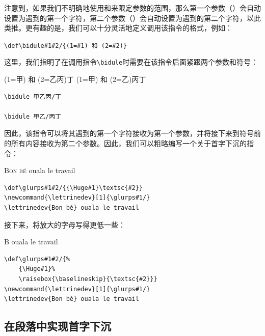 注意到，如果我们不明确地使用\dm{\{}和\dm{\}}来限定参数的范围，那么第一个参数（）会自动设置为遇到的第一个字符，第二个参数（）会自动设置为遇到的第二个字符，以此类推。更有趣的是，我们可以十分灵活地定义调用该指令的格式，例如：

\begin{dmd}
\verb|\def\bidule#1#2/{(1=#1) 和 (2=#2)}|
\end{dmd}

这里，我们指明了在调用指令\verb|\bidule|时需要在该指令后面紧跟两个参数和符号\dm{/}：

\begin{codelist}[11.20]{
\def\bidule#1#2/{(1=#1) 和 (2=#2)}
\bidule 甲乙丙/丁
\bidule 甲乙/丙丁
}\begin{verbatim}
\bidule 甲乙丙/丁

\bidule 甲乙/丙丁
\end{verbatim}
\end{codelist}

因此，该指令可以将其遇到的第一个字符接收为第一个参数，并将接下来到符号\dm{/}前的所有内容接收为第二个参数。因此，我们可以粗略编写一个关于首字下沉的指令：

\begin{codelist}[11.21]{
\def\glurps#1#2/{{\Huge#1}\textsc{#2}}
\newcommand{\lettrinedev}[1]{\glurps#1/}
\lettrinedev{Bon bé} ouala le travail
}\begin{verbatim}
\def\glurps#1#2/{{\Huge#1}\textsc{#2}}
\newcommand{\lettrinedev}[1]{\glurps#1/}
\lettrinedev{Bon bé} ouala le travail
\end{verbatim}
\end{codelist}

接下来，将放大的字母写得更低一些：

\begin{codelist}[11.22]{
    \def\glurps#1#2/{%
    {\Huge#1}%
    \raisebox{\baselineskip}{\textsc{#2}}}
\newcommand{\lettrinedev}[1]{\glurps#1/}
\lettrinedev{Bon bé} ouala le travail
}\begin{verbatim}
\def\glurps#1#2/{%
    {\Huge#1}%
    \raisebox{\baselineskip}{\textsc{#2}}}
\newcommand{\lettrinedev}[1]{\glurps#1/}
\lettrinedev{Bon bé} ouala le travail
\end{verbatim}
\end{codelist}

\subsection{在段落中实现首字下沉}

